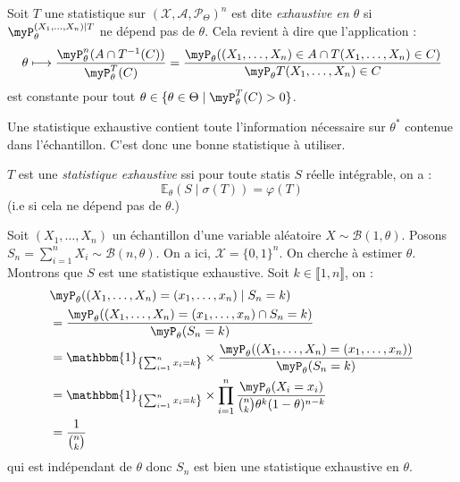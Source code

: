 \begin{definition}
    Soit $T$ une statistique sur $( \mathcal{X}, \mathcal{A}, \mathcal{P}_\Theta)^n$ est dite \emph{exhaustive en $ \theta$}
    si $ \myP_\theta^{(X_1, \dots, X_n) \mid T}$ ne dépend pas de $ \theta$. Cela revient 
    à dire que l'application : 
        $$ \theta \longmapsto \frac{ \myP_\theta^n (A \cap T^{-1}(C))}{ \myP_\theta^T(C)} 
            = \frac{ \myP_\theta((X_1, \dots, X_n) \in A \cap T(X_1, \dots, X_n) \in C)}{ \myP_\theta T(X_1, \dots, X_n) \in C} $$
    est constante pour tout $ \theta \in \{ \theta \in \Theta \mid \myP_\theta^T(C) > 0\}$. 
\end{definition}

Une statistique exhaustive contient toute l'information nécessaire sur $ \theta^*$ contenue 
dans l'échantillon. C'est donc une bonne statistique à utiliser. 

\begin{proposition}
    $T$ est une \emph{statistique exhaustive} ssi pour toute statis $S$ réelle intégrable, on a : 
        \begin{equation}
            \mathbb{E}_\theta(S \mid \sigma(T)) = \varphi( T)
        \end{equation}
    (i.e si cela ne dépend pas de $ \theta$.)
\end{proposition}

\begin{example}
    Soit $(X_1, \dots, X_n)$ un échantillon d'une variable aléatoire $ X \sim \mathcal{B}(1, \theta)$. Posons 
    $S_n = \sum_{i=1}^{n} X_i \sim \mathcal{B}(n, \theta)$. On a ici, $ \mathcal{X} = \{0, 1\}^n$. 
    On cherche à estimer $ \theta$. Montrons que $S$ est une statistique exhaustive. 
    Soit $k \in \llbracket 1, n \rrbracket$, on : 
    \begin{align*}
        & \myP_\theta ((X_1, \dots, X_n) = (x_1, \dots, x_n) \mid S_n = k) \\ 
        &= \frac{ \myP_\theta( (X_1, \dots, X_n) = (x_1, \dots, x_n) \cap S_n = k)}{ \myP_\theta(S_n = k)} \\ 
        &= \mathbbm{1}_{\left\{\sum_{i=1}^{n} x_i = k\right\}} \times  \frac{ \myP_\theta( (X_1, \dots, X_n) = (x_1, \dots, x_n))}{ \myP_\theta(S_n = k)} \\ 
        &= \mathbbm{1}_{\left\{\sum_{i=1}^{n} x_i = k\right\}} \times \prod_{i=1}^{n} \frac{ \myP_\theta(X_i = x_i)}{ \binom{n}{k} \theta^k (1 - \theta)^{n - k}} \\ 
        &= \frac{1}{\binom{n}{k}}
    \end{align*}
    qui est indépendant de $ \theta$ donc $S_n$ est bien une statistique exhaustive en $ \theta$. 
\end{example}

